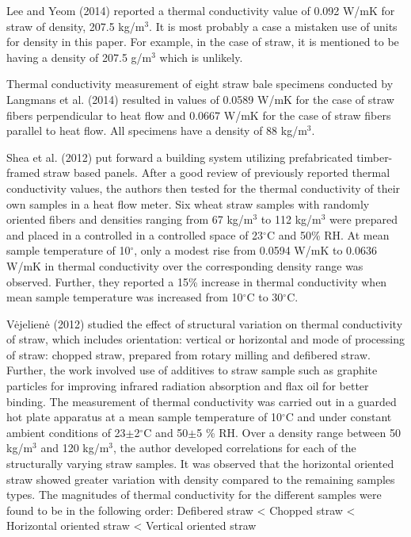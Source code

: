 \documentclass[12pt]{report}
\begin{document}
 Lee and Yeom (2014) reported a thermal conductivity value of 0.092 W/mK
for straw of density, 207.5 kg/m\(^{3}\). It is most probably a case a
mistaken use of units for density in this paper. For example, in the
case of straw, it is mentioned to be having a density of 207.5
g/m\(^{3}\) which is unlikely.

 Thermal conductivity measurement of eight straw bale specimens
conducted by Langmans et al. (2014) resulted in values of 0.0589 W/mK
for the case of straw fibers perpendicular to heat flow and 0.0667 W/mK
for the case of straw fibers parallel to heat flow. All specimens have a
density of 88 kg/m\(^{3}\).

Shea et al. (2012) put forward a building system utilizing prefabricated
timber-framed straw based panels. After a good review of previously
reported thermal conductivity values, the authors then tested for the
thermal conductivity of their own samples in a heat flow meter. Six
wheat straw samples with randomly oriented fibers and densities ranging
from 67 kg/m\(^{3}\) to 112 kg/m\(^{3}\) were prepared and placed in a
controlled in a controlled space of 23\(^{\circ}\)C and 50\% RH. At mean
sample temperature of 10\(^{\circ}\), only a modest rise from 0.0594
W/mK to 0.0636 W/mK in thermal conductivity over the corresponding
density range was observed. Further, they reported a 15\% increase in
thermal conductivity when mean sample temperature was increased from
10\(^{\circ}\)C to 30\(^{\circ}\)C.

 Vėjelienė (2012) studied the effect of structural variation on thermal
conductivity of straw, which includes orientation: vertical or
horizontal and mode of processing of straw: chopped straw, prepared from
rotary milling and defibered straw. Further, the work involved use of
additives to straw sample such as graphite particles for improving
infrared radiation absorption and flax oil for better binding. The
measurement of thermal conductivity was carried out in a guarded hot
plate apparatus at a mean sample temperature of 10\(^{\circ}\)C and
under constant ambient conditions of 23\(\pm\)2\(^{\circ}\)C and
50\(\pm\)5 \% RH. Over a density range between 50 kg/m\(^{3}\) and 120
kg/m\(^{3}\), the author developed correlations for each of the
structurally varying straw samples. It was observed that the horizontal
oriented straw showed greater variation with density compared to the
remaining samples types. The magnitudes of thermal conductivity for the
different samples were found to be in the following order: Defibered
straw \textless{} Chopped straw \textless{} Horizontal oriented straw
\textless{} Vertical oriented straw
\end{document}
